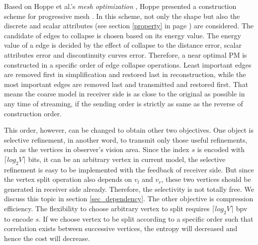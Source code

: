 \documentclass[11pt, a4paper]{report}
\begin{document}
    Based on Hoppe et al.'s
    \emph{mesh optimization} \cite{166119}, Hoppe presented a
    construction scheme for progressive mesh \cite{hoppe96progressive}. 
    In this scheme, not only the shape but
    also the discrete and scalar attributes (see section
    \ref{property} in page \pageref{property}) are considered. The
    candidate of edges to collapse is chosen based on its energy
    value. The energy value of a edge is decided by the effect of
    collapse to the distance error, scalar attributes error and
    discontinuity curves error. Therefore, a near optimal PM is
    constructed in a specific order of edge collapse operations. Least
    important edges are removed first in simplification and restored
    last in reconstruction, while the most important edges are removed
    last and transmitted and restored first. That means the coarse
    model in receiver side is as close to the original as possible in
    any time of streaming, if the sending order is strictly as same as
    the reverse of construction order.

    This order, however, can be changed to obtain other two
    objectives. One object is selective refinement, in another word,
    to transmit only those useful refinements, such as the vertices in
    observer's vision area. Since the index $s$ is encoded with
    ${\lceil}log_{2}V{\rceil}$ bits, it can be an arbitrary vertex in
    current model, the selective refinement is easy to be implemented
    with the feedback of receiver side. But since the vertex
    split operation also depends on $v_{l}$ and $v_{r}$, these two
    vertices should be generated in receiver side already. Therefore,
    the selectivity is not totally free. We discuss this topic in
    section \ref{sec_dependency}. 
    The other objective is compression efficiency. 
    The flexibility to choose arbitrary vertex to split 
    requires ${\lceil}log_{2}V{\rceil}$ bpv to encode $s$. 
    If we choose vertex to be split according to a specific order 
    such that correlation exists between successive vertices, 
    the entropy will decreased and hence the cost will decrease.
\end{document}
